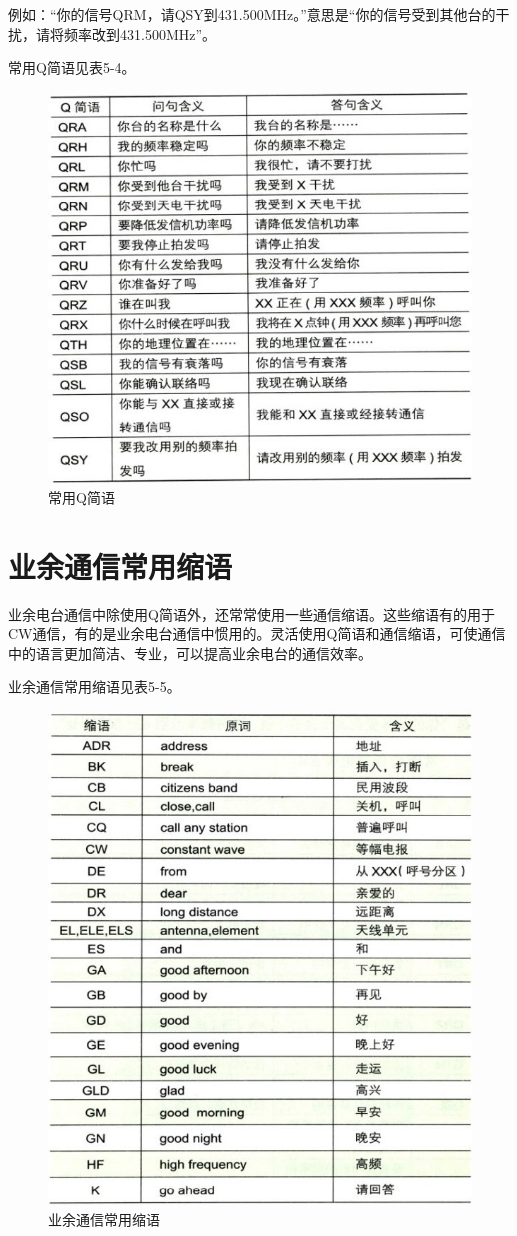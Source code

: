 \documentclass[12pt,UTF8]{ctexbook}
\begin{document}
例如：“你的信号QRM，请QSY到431.500MHz。”意思是“你的信号受到其他台的干扰，请将频率改到431.500MHz”。

常用Q简语见表5-4。

\begin{figure}[htbp]
	\centering
	\includegraphics[width=0.7\linewidth]{64}
	\caption{常用Q简语}
	\label{fig:1}
\end{figure}

\section{业余通信常用缩语}

业余电台通信中除使用Q简语外，还常常使用一些通信缩语。这些缩语有的用于CW通信，有的是业余电台通信中惯用的。灵活使用Q简语和通信缩语，可使通信中的语言更加简洁、专业，可以提高业余电台的通信效率。

业余通信常用缩语见表5-5。

\begin{figure}[htbp]
	\centering
	\includegraphics[width=0.7\linewidth]{65}
	\caption{业余通信常用缩语}
	\label{fig:1}
\end{figure}
\end{document}
